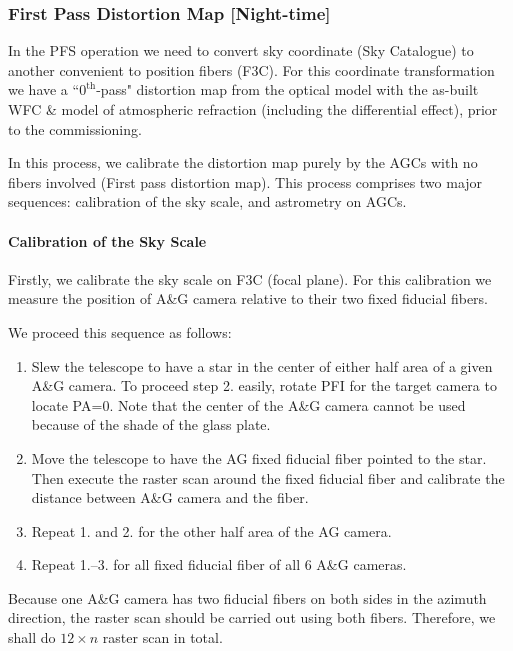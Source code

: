 \subsubsection{First Pass Distortion Map [Night-time]}\label{secflow:1stDM}

In the PFS operation we need to convert sky coordinate (Sky Catalogue) to another convenient to position fibers (F3C).
For this coordinate transformation we have a ``$0^\mathrm{th}$-pass" distortion map from the optical model with the as-built WFC \& model of atmospheric refraction (including the differential effect), prior to the commissioning.

In this process, we calibrate the distortion map purely by the AGCs with no fibers involved (First pass distortion map).
This process comprises two major sequences: calibration of the sky scale, and astrometry on AGCs.

\paragraph{Calibration of the Sky Scale}
Firstly, we calibrate the sky scale on F3C (focal plane).
For this calibration we measure the position of A\&G camera relative to their two fixed fiducial fibers.

We proceed this sequence as follows:
\begin{enumerate}
\item Slew the telescope to have a star in the center of either half area of a given A\&G camera.
To proceed step 2. easily, rotate PFI for the target camera to  locate PA=0.
Note that the center of the A\&G camera cannot be used because of the shade of the glass plate.
\item  Move the telescope to have the AG fixed fiducial fiber pointed to the star.
Then execute the raster scan around the fixed fiducial fiber and calibrate the distance between A\&G camera and the fiber.
\item Repeat 1. and 2. for the other half area of the AG camera.
\item Repeat 1.--3. for all fixed fiducial fiber of all 6 A\&G cameras.
\end{enumerate}
Because one A\&G camera has two fiducial fibers on both sides in the azimuth direction, the raster scan should be carried out using both fibers.
Therefore, we shall do $12 \times n$ raster scan in total.

